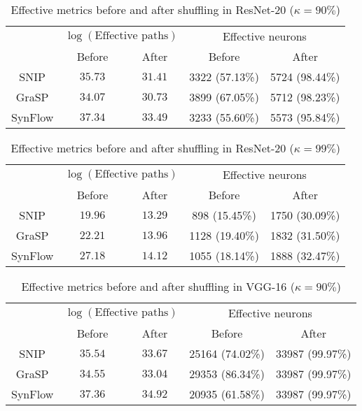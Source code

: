 \begin{table}[h!]
\centering
\begin{tabular}{|c|cc|cc|}
\hline
        & \multicolumn{2}{c|}{$\log(\text{Effective paths})$} & \multicolumn{2}{c|}{Effective neurons} \\ \cline{2-5} 
        & Before            & After            & Before             & After             \\ \hline
SNIP    & $35.73$         & $31.41$        & 3322 (57.13\%)      & 5724 (98.44\%)    \\ \hline
GraSP   & $34.07$         & $30.73$        & 3899 (67.05\%)     & 5712 (98.23\%)    \\ \hline
SynFlow & $37.34$         & $33.49$        & 3233 (55.60\%)     & 5573 (95.84\%)    \\ \hline
\end{tabular}
\caption{Effective metrics before and after shuffling in ResNet-20 ($\kappa=90\%$)}
\label{table:resnet20-90}
\end{table}
\begin{table}[h!]
\centering
\begin{tabular}{|c|cc|cc|}
\hline
        & \multicolumn{2}{c|}{$\log(\text{Effective paths})$} & \multicolumn{2}{c|}{Effective neurons} \\ \cline{2-5} 
        & Before            & After            & Before             & After             \\ \hline
SNIP    & $19.96$         & $13.29$        & 898 (15.45\%)      & 1750 (30.09\%)    \\ \hline
GraSP   & $22.21$         & $13.96$        & 1128 (19.40\%)     & 1832 (31.50\%)    \\ \hline
SynFlow & $27.18$         & $14.12$        & 1055 (18.14\%)     & 1888 (32.47\%)    \\ \hline
\end{tabular}
\caption{Effective metrics before and after shuffling in ResNet-20 ($\kappa=99\%$)}
\label{table:resnet20-99}
\end{table}
\begin{table}[h!]
\centering
\begin{tabular}{|c|cc|cc|}
\hline
        & \multicolumn{2}{c|}{$\log(\text{Effective paths})$} & \multicolumn{2}{c|}{Effective neurons} \\ \cline{2-5} 
        & Before            & After            & Before             & After             \\ \hline
SNIP    & $35.54$         & $33.67$        & 25164 (74.02\%)      & 33987 (99.97\%)    \\ \hline
GraSP   & $34.55$         & $33.04$        & 29353 (86.34\%)     & 33987 (99.97\%)    \\ \hline
SynFlow & $37.36$         & $34.92$        & 20935 (61.58\%)     & 33987 (99.97\%)    \\ \hline
\end{tabular}
\caption{Effective metrics before and after shuffling in VGG-16 ($\kappa=90\%$)}
\label{table:vgg16-90}
\end{table}
